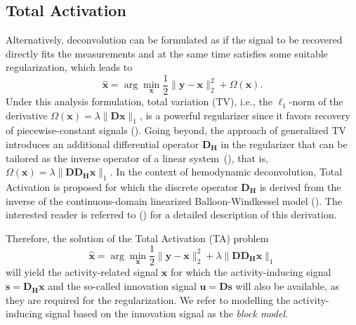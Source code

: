 \subsection{Total Activation}
Alternatively, deconvolution can be formulated as if the signal to be recovered directly fits the measurements and at the same time satisfies some suitable regularization, which leads to
\begin{equation}
\label{eq:analysis_model}
    \hat{\mathbf{x}} = \arg \min_{\mathbf{x}} \frac{1}{2} \| \mathbf{y} - \mathbf{x} \|_2^2 + \Omega(\mathbf{x}).
\end{equation}
Under this analysis formulation, total variation (TV), i.e., the $\ell_1$-norm of the derivative $\Omega(\mathbf{x})=\lambda \|\mathbf{Dx}\|_1$, is a powerful regularizer since it favors recovery of piecewise-constant signals (\citealt{Chambolle2004TotalVariation}). Going beyond, the approach of generalized TV introduces an additional differential operator $\mathbf{D_H}$ in the regularizer that can be tailored as the inverse operator of a linear system~(\citealt{Karahanoglu2011SignalProcessingApproach}), that is, $\Omega(\mathbf{x})=\lambda \|\mathbf{D D_H x}\|_1$. In the context of hemodynamic deconvolution, Total Activation is proposed for which the discrete operator $\mathbf{D_H}$ is derived from the inverse of the continuous-domain linearized Balloon-Windkessel model (\citealt{Buxton1998BalloonModel,Friston2000Nonlinear-Balloon}). %
The interested reader is referred to (\citealt{Khalidov2011ActiveletsWaveletssparse,Karahanoglu2011SignalProcessingApproach,Karahanoglu2013TotalactivationfMRI}) for a detailed description of this derivation. 

Therefore, the solution of the Total Activation (TA) problem
\begin{equation}
\label{eq:TA}
    \hat{\mathbf{x}} = \arg \min_{\mathbf{x}} \frac{1}{2} \| \mathbf{y} - \mathbf{x} \|_2^2 + \lambda \|\mathbf{D D_H x} \|_1
\end{equation}
will yield the activity-related signal $\mathbf{x}$ for which the activity-inducing signal $\mathbf{s}=\mathbf{D_H x}$ and the so-called innovation signal $\mathbf{u}=\mathbf{Ds}$ will also be available, as they are required for the regularization. We refer to modelling the activity-inducing signal based on the innovation signal as the \textit{block model}.

